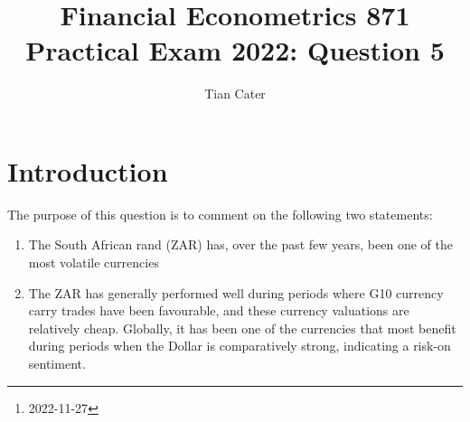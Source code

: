 \documentclass[11pt,preprint, authoryear]{elsarticle}
\numberwithin{equation}{section}
\numberwithin{figure}{section}
\numberwithin{table}{section}
\let\rmarkdownfootnote\footnote%
\def\footnote{\protect\rmarkdownfootnote}
\begin{document}
\begin{frontmatter}  %

\title{Financial Econometrics 871 Practical Exam 2022: Question 5}





\author[Add1]{Tian Cater}





\address[Add1]{University of Stellenbosch, Western Cape, South
Africa\footnote{2022-11-27}}



\vspace{1cm}





\vspace{0.5cm}

\end{frontmatter}



\pagestyle{fancy}
\chead{}
\lfoot{}
\lhead{}
\cfoot{}


\headsep 35pt %




\hypertarget{introduction}{%
\section{\texorpdfstring{Introduction
\label{Introduction}}{Introduction }}\label{introduction}}

The purpose of this question is to comment on the following two
statements:

\begin{enumerate}
  \item The South African rand (ZAR) has, over the past few years, been one of the most volatile currencies
  \item The ZAR has generally performed well during periods where G10 currency carry trades have been favourable, and these currency valuations are relatively cheap. Globally, it has been one of the currencies that most benefit during periods when the Dollar is comparatively strong, indicating a risk-on sentiment.
\end{enumerate}
\end{document}

